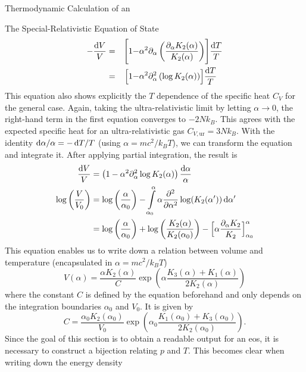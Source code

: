 \begin{section}{Thermodynamic Calculation of an \texorpdfstring{}{EoS}}
\begin{subsection}{The Special-Relativistic Equation of State}
\begin{alignat}{3}
    - \frac{\mathop{}\!\mathrm{d} V}{V} &= &\Biggl[1 - &\alpha^2\partial_\alpha\left(\frac{\partial_\alpha K_2(\alpha)}{K_2(\alpha)}\right)\Biggr]\frac{\mathop{}\!\mathrm{d} T}{T}\\
    &= &\Bigl[1 - &\alpha^2\partial_\alpha^2\left(\log K_2(\alpha)\right)\Bigr]\frac{\mathop{}\!\mathrm{d} T}{T}
\end{alignat}
This equation also shows explicitly the $T$ dependence of the specific heat $C_V$ for the general case.
Again, taking the ultra-relativistic limit by letting $\alpha\rightarrow0$, the right-hand term in the first equation converges to $-2Nk_B$.
This agrees with the expected specific heat for an ultra-relativistic gas $C_{V,\text{ur}}=3Nk_B$.
With the identity $\mathop{}\!\mathrm{d}\alpha/\alpha = -\mathop{}\!\mathrm{d} T/T$ (using $\alpha=mc^2/k_B T$), we can transform the equation and integrate it.
After applying partial integration, the result is
\begin{align}
	\frac{\mathop{}\!\mathrm{d} V}{V} &= \left(1-\alpha^2\partial_\alpha^2\log K_2(\alpha)\right)\frac{\mathop{}\!\mathrm{d}\alpha}{\alpha}\\
    \log\left(\frac{V}{V_0}\right) &= \log\left(\frac{\alpha}{\alpha_0}\right) - \int\limits_{\alpha_0}^\alpha \alpha\frac{\partial^2}{\partial \alpha^2}\log(K_2(\alpha'))\mathop{}\!\mathrm{d}\alpha'\\
    &=\log\left(\frac{\alpha}{\alpha_0}\right) + \log\left(\frac{K_2(\alpha)}{K_2(\alpha_0)}\right) - \Bigl[\alpha\frac{\partial_\alpha K_2}{K_2}\Bigr]_{\alpha_0}^\alpha
\end{align}
This equation enables us to write down a relation between volume and temperature (encapsulated in $\alpha=mc^2/k_B T$)
\begin{equation}
	V(\alpha) = \frac{\alpha K_2(\alpha)}{C}\exp\left(\alpha\frac{K_3(\alpha)+K_1(\alpha)}{2K_2(\alpha)}\right)
	\label{eq:2-IntEner-Volume-Alpha-Dependence}
\end{equation}
where the constant $C$ is defined by the equation beforehand and only depends on the integration boundaries $\alpha_0$ and $V_0$.
It is given by
\begin{equation}
	C = \frac{\alpha_0 K_2(\alpha_0)}{V_0}\exp\left(\alpha_0\frac{K_1(\alpha_0)+K_3(\alpha_0)}{2K_2(\alpha_0)}\right).
	\label{eq:2-IntEner-Parameter-Eos-Integration-Result}
\end{equation}
Since the goal of this section is to obtain a readable output for an \ac{eos}, it is necessary to construct a bijection relating $p$ and $T$.
This becomes clear when writing down the energy density %
\begin{equation}

\end{equation}
\end{subsection}
\end{section}
